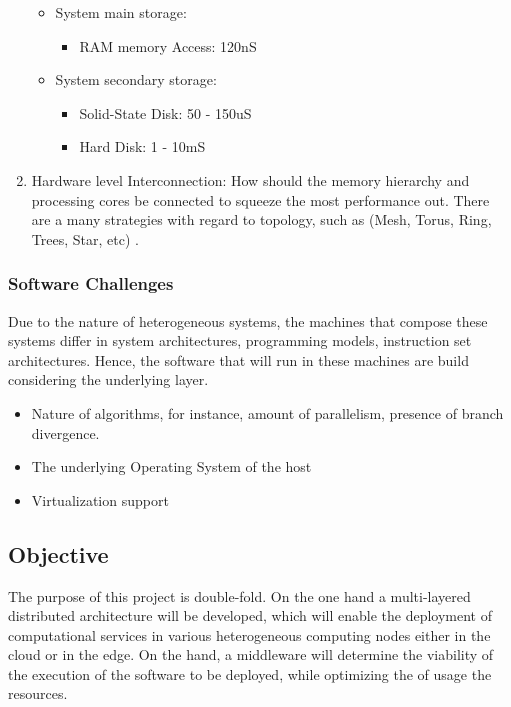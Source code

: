 \begin{enumerate}
\begin{itemize}
                        \item System main storage:
                            \begin{itemize}
                                \item RAM memory Access: 120nS
                            \end{itemize}
                        \item System secondary storage:
                        \begin{itemize}
                            \item Solid-State Disk: 50 - 150uS
                            \item Hard Disk: 1 - 10mS
                        \end{itemize}
                    \end{itemize}
                    
                
                \item Hardware level Interconnection: How should the memory hierarchy and processing cores be connected to squeeze the most performance out. There are a many strategies with regard to topology, such as (Mesh, Torus, Ring, Trees, Star, etc) \cite{fernandez-alonso_survey_2012}.
            \end{enumerate}
        
        \subsubsection{Software Challenges}
            Due to the nature of heterogeneous systems, the machines that compose these systems differ in system architectures, programming models, instruction set architectures. Hence, the software that will run in these machines are build considering the underlying layer.
            
            \begin{itemize}
                \item Nature of algorithms, for instance, amount of parallelism, presence of branch divergence.
                \item The underlying Operating System of the host
                \item Virtualization support
            \end{itemize}
            
    \subsection{Objective} \label{objective}
        The purpose of this project is double-fold. On the one hand a multi-layered distributed architecture will be developed, which will enable the deployment of computational services in various heterogeneous computing nodes either in the cloud or in the edge. On the hand, a middleware will determine the viability of the execution of the software to be deployed, while optimizing the of usage the resources.
        
